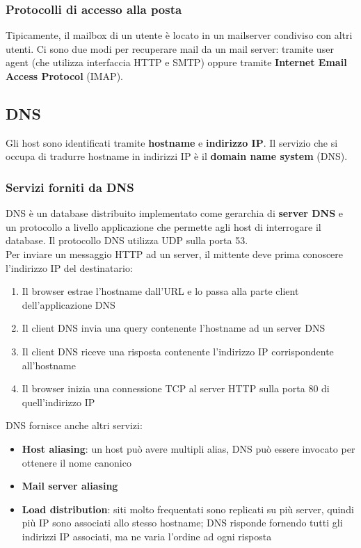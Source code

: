 \documentclass[11pt]{article}
\begin{document}
\subsubsection{Protocolli di accesso alla posta}
Tipicamente, il mailbox di un utente è locato in un mailserver condiviso con altri utenti. Ci sono due modi per recuperare
mail da un mail server: tramite user agent (che utilizza interfaccia HTTP e SMTP) oppure tramite 
\textbf{Internet Email Access Protocol} (IMAP).
\subsection{DNS}
Gli host sono identificati tramite \textbf{hostname} e \textbf{indirizzo IP}.
Il servizio che si occupa di tradurre hostname in indirizzi IP è il \textbf{domain name system} (DNS).
\subsubsection{Servizi forniti da DNS}
DNS è un database distribuito implementato come gerarchia di \textbf{server DNS} e un protocollo a livello applicazione
che permette agli host di interrogare il database. Il protocollo DNS utilizza UDP sulla porta 53.\\
Per inviare un messaggio HTTP ad un server, il mittente deve prima conoscere l'indirizzo IP del destinatario:
\begin{enumerate}
    \item Il browser estrae l'hostname dall'URL e lo passa alla parte client dell'applicazione DNS
    \item Il client DNS invia una query contenente l'hostname ad un server DNS
    \item Il client DNS riceve una risposta contenente l'indirizzo IP corrispondente all'hostname
    \item Il browser inizia una connessione TCP al server HTTP sulla porta 80 di quell'indirizzo IP
\end{enumerate}
DNS fornisce anche altri servizi:
\begin{itemize}
    \item \textbf{Host aliasing}: un host può avere multipli alias, DNS può essere invocato per ottenere il nome canonico
    \item \textbf{Mail server aliasing}
    \item \textbf{Load distribution}: siti molto frequentati sono replicati su più server, quindi più IP sono associati
    allo stesso hostname; DNS risponde fornendo tutti gli indirizzi IP associati, ma ne varia l'ordine ad ogni risposta
\end{itemize}
\end{document}
